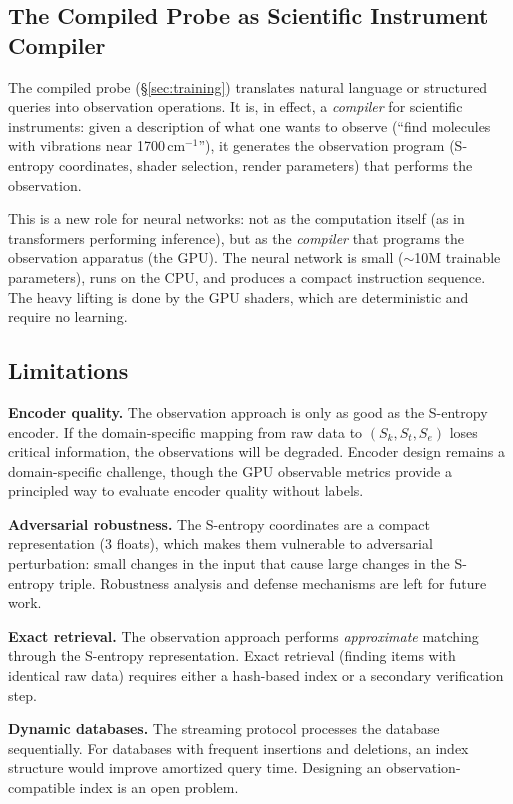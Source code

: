 \documentclass[11pt,twocolumn,a4paper]{article}
\newcommand{\Sk}{S_k}
\newcommand{\St}{S_t}
\newcommand{\Se}{S_e}
\begin{document}
\subsection{The Compiled Probe as Scientific Instrument Compiler}

The compiled probe (\S\ref{sec:training}) translates natural language
or structured queries into observation operations. It is, in effect,
a \emph{compiler} for scientific instruments: given a description of
what one wants to observe (``find molecules with vibrations near
1700\,cm$^{-1}$''), it generates the observation program (S-entropy
coordinates, shader selection, render parameters) that performs the
observation.

This is a new role for neural networks: not as the computation itself
(as in transformers performing inference), but as the \emph{compiler}
that programs the observation apparatus (the GPU). The neural network
is small ($\sim$10M trainable parameters), runs on the CPU, and
produces a compact instruction sequence. The heavy lifting is done
by the GPU shaders, which are deterministic and require no learning.

\subsection{Limitations}

\textbf{Encoder quality.} The observation approach is only as good as
the S-entropy encoder. If the domain-specific mapping from raw data
to $(\Sk, \St, \Se)$ loses critical information, the observations
will be degraded. Encoder design remains a domain-specific challenge,
though the GPU observable metrics provide a principled way to evaluate
encoder quality without labels.

\textbf{Adversarial robustness.} The S-entropy coordinates are a
compact representation (3 floats), which makes them vulnerable to
adversarial perturbation: small changes in the input that cause
large changes in the S-entropy triple. Robustness analysis and
defense mechanisms are left for future work.

\textbf{Exact retrieval.} The observation approach performs
\emph{approximate} matching through the S-entropy representation.
Exact retrieval (finding items with identical raw data) requires
either a hash-based index or a secondary verification step.

\textbf{Dynamic databases.} The streaming protocol processes the
database sequentially. For databases with frequent insertions and
deletions, an index structure would improve amortized query time.
Designing an observation-compatible index is an open problem.
\end{document}
